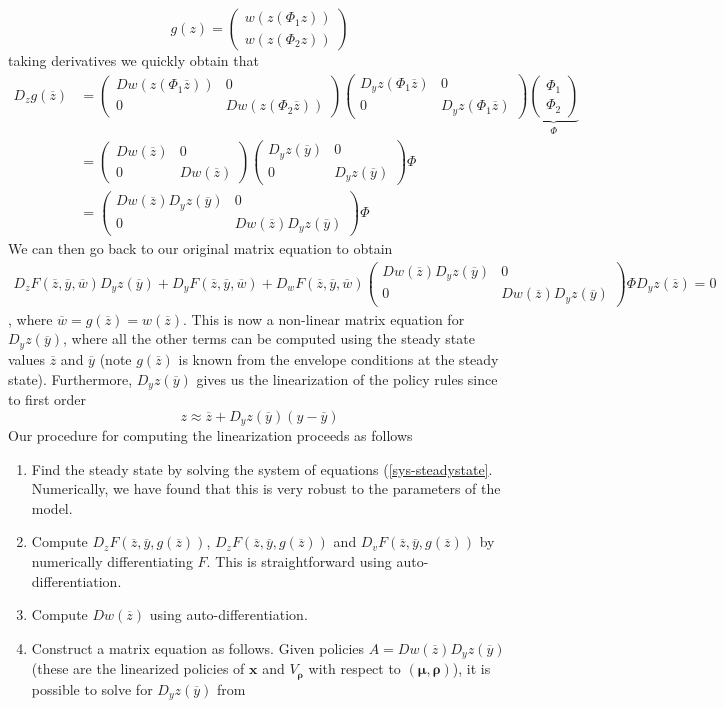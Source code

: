 \documentclass[thmsb,11pt]{article}
\newcommand{\bmat}{\begin{matrix}}
\newcommand{\emat}{\end{matrix}}
\newcommand{\ov}{\overline}
\begin{document}
\begin{appendix}
\[
	g(z) = \left(\bmat w(z(\Phi_1 z))\\ w(z(\Phi_2 z))\emat\right)
\]taking derivatives we quickly obtain that
\begin{align*}
	D_z g(\ov z) &= \left(\bmat D w(z(\Phi_1 \ov z)) & 0 \\ 0&  D w(z(\Phi_2 \ov z))\emat\right)\left(\bmat D_y z(\Phi_1 \ov z) & 0\\ 0& D_y z(\Phi_1\ov z)\emat\right) \underbrace{\left(\bmat \Phi_1\\ \Phi_2\emat\right)}_{\Phi}\\
	&=\left(\bmat Dw(\ov z) &0\\0& D w(\ov z)\emat\right)\left(\bmat D_y z(\ov y) &0\\0&D_y z(\ov y)\emat\right)\Phi\\
	&=\left(\bmat Dw(\ov z)D_y z(\ov y) &0\\0& D w(\ov z)D_y z(\ov y)\emat\right)\Phi
\end{align*}  We can then go back to our original matrix equation to obtain
\begin{align}
	D_zF(\ov z,\ov y, \ov w)D_yz(\ov y)+D_yF(\ov z, \ov y, \ov w) + D_w F(\ov z, \ov y, \ov w)\left(\bmat Dw(\ov z)D_y z(\ov y) &0\\0& D w(\ov z)D_y z(\ov y)\emat\right)\Phi D_y z(\ov z) = 0\label{eq.linearization}
\end{align}, where $\ov w = g(\ov z) = w(\ov z)$.  This is now a non-linear matrix equation for $D_y z(\ov y)$,  where all the other terms can be computed using the steady state values $\ov z$ and $\ov y$ (note $g(\ov z)$ is known from the envelope conditions at the steady state).  Furthermore, $D_y z(\ov y)$ gives us the linearization of the policy rules since to first order
\[
	z \approx \ov z + D_y z(\ov y)(y-\ov y)
\]Our procedure for computing the linearization proceeds as follows
	\begin{enumerate}
		\item Find the steady state by solving the system of equations (\ref{sys-steadystate}.  Numerically, we have found that this is very robust to the parameters of the model.
		\item  Compute $D_zF(\ov z,\ov y,g(\ov z))$, $D_zF(\ov z,\ov y,g(\ov z))$ and $D_vF(\ov z,\ov y,g(\ov z))$ by numerically differentiating $F$.  This is straightforward using auto-differentiation.
		\item  Compute $Dw(\ov z)$ using auto-differentiation.
		\item  Construct a matrix equation as follows.  Given policies $A = Dw(\ov z)D_yz(\ov y)$ (these are the linearized policies of $\bm x$ and $V_{\bm \rho}$ with respect to $(\bm \mu,\bm \rho)$), it is possible to solve for $D_yz(\ov y)$ from

\end{enumerate}
\end{appendix}
\end{document}

